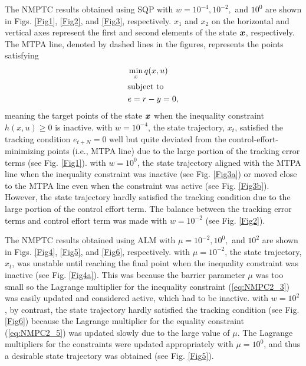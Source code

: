 \documentclass[journal]{IEEEtranTIE}
\begin{document}
The NMPTC results obtained using SQP with $w = 10^{-4}, 10^{-2},$ and $10^{0}$ are shown in Figs. \ref{Fig1}, \ref{Fig2}, and \ref{Fig3}, respectively. $x_1$ and $x_2$ on the horizontal and vertical axes represent the first and second elements of the state $\boldsymbol{x}$, respectively. The MTPA line, denoted by dashed lines in the figures, represents the points satisfying
\begin{subequations}
\begin{align}
&\mathop {\min }\limits_x q(x,u)\\\nonumber
&{\rm{subject\ to}}\\
&e = r - y = 0,
\end{align}
\end{subequations}
meaning the target points of the state $\boldsymbol{x}$ when the inequality constraint $h(x,u) \ge 0$ is inactive. with $w = 10^{-4}$, the state trajectory, $x_t$, satisfied the tracking condition $e_{t+N} = 0$ well but quite deviated from the control-effort-minimizing points (i.e., MTPA line) due to the large portion of the tracking error terms (see Fig. \ref{Fig1}). with $w = 10^{0}$, the state trajectory aligned with the MTPA line when the inequality constraint was inactive (see Fig. \ref{Fig3a}) or moved close to the MTPA line even when the constraint was active (see Fig. \ref{Fig3b}). However, the state trajectory hardly satisfied the tracking condition due to the large portion of the control effort term. The balance between the tracking error terms and control effort term was made with $w = 10^{-2}$ (see Fig. \ref{Fig2}).

The NMPTC results obtained using ALM with $\mu = 10^{-2}, 10^{0},$ and $10^{2}$ are shown in Figs. \ref{Fig4}, \ref{Fig5}, and \ref{Fig6}, respectively. with $\mu = 10^{-2}$, the state trajectory, $x_t$, was unstable until reaching the final point when the inequality constraint was inactive (see Fig. \ref{Fig4a}). This was because the barrier parameter $\mu$ was too small so the Lagrange multiplier for the inequality constraint (\ref{eq:NMPC2_3}) was easily updated and considered active, which had to be inactive.
with $w = 10^{2}$, by contrast, the state trajectory hardly satisfied the tracking condition (see Fig. \ref{Fig6}) because the Lagrange multiplier for the equality constraint (\ref{eq:NMPC2_5}) was updated slowly due to the large value of $\mu$. The Lagrange multipliers for the constraints were updated appropriately with $\mu = 10^{0}$, and thus a desirable state trajectory was obtained (see Fig. \ref{Fig5}).
\end{document}
